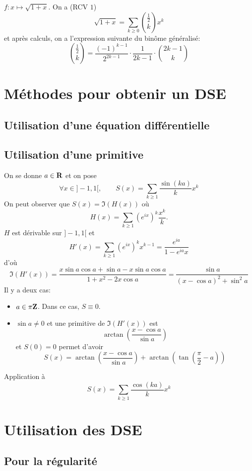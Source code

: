 \begin{ex}
    $f:x\longmapsto \sqrt{1+x}$. On a (RCV $1$) \[
        \sqrt{1+x}=\sum_{k\geq 0}\binom {\frac12}kx^k
    \]
    et après calculs, on a l'expression suivante du binôme généralisé: \[
        \binom{\frac12}k=\frac{(-1)^{k-1}}{2^{2k-1}}\cdot \frac1{2k-1}\cdot \binom{2k-1}k
    \]
\end{ex}

\section{Méthodes pour obtenir un DSE}
\subsection{Utilisation d'une équation différentielle}

\subsection{Utilisation d'une primitive}
On se donne $a\in\mathbf R$ et on pose \[
    \forall x\in ]-1, 1[, \qquad S(x)=\sum_{k\geq 1}\frac{\sin(ka)}kx^k
\]
On peut observer que $S(x)=\Im(H(x))$ où \[
    H(x)=\sum_{k\geq 1}(e^{ix})^k\frac{x^k}k.
\]
$H$ est dérivable sur $]-1, 1[$ et \[
    H'(x)=\sum_{k\geq 1}(e^{ix})^kx^{k-1}=\frac{e^{ia}}{1-e^{ia}x}
\]
d'où \[
    \Im(H'(x))=\frac{x\sin a\cos a+\sin a-x\sin a\cos a}{1+x^2-2x\cos a}=\frac{\sin a}{(x-\cos a)^2+\sin^2a}
\]
Il y a deux cas: \begin{itemize}
    \item $a\in\pi\mathbf Z$. Dans ce cas, $S\equiv 0$.
    \item $\sin a\neq 0$ et une primitive de $\Im(H'(x))$ est \[
            \arctan \left( \frac{x-\cos a}{\sin a} \right)
        \]
        et $S(0)=0$ permet d'avoir \[
            S(x)=\arctan \left( \frac{x-\cos a}{\sin a} \right)+\arctan \left( \tan \left( \frac\pi2-a \right) \right)
        \]
\end{itemize}

\begin{exo}
    Application à \[
        S(x)=\sum_{k\geq 1}\frac{\cos (ka)}kx^k
    \]
\end{exo}

\section{Utilisation des DSE}

\subsection{Pour la régularité}

